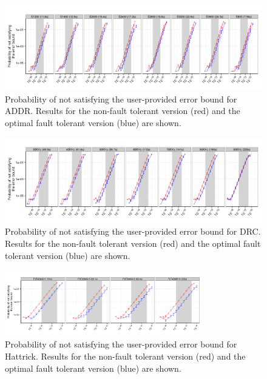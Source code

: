 \documentclass{sig-alternate}
\begin{document}
{\begin{figure}[ht!]
\centering
\includegraphics[width=7in]{figs/Lasso_Par_Seq_ImperfectRate_log.png}
\vspace{-10pt}
\caption{Probability of not satisfying the user-provided error bound for ADDR. Results for the non-fault tolerant version (red) and the optimal fault tolerant version (blue) are shown.}
\vspace{-10pt}
\label{fig:Lasso_ImperfectRate}
\end{figure}

\begin{figure}[ht!]
\centering
\includegraphics[width=7in]{figs/DRC_Par_Seq_ImperfectRate_log.png}
\vspace{-10pt}
\caption{Probability of not satisfying the user-provided error bound for DRC. Results for the non-fault tolerant version (red) and the optimal fault tolerant version (blue) are shown.}
\vspace{-10pt}
\label{fig:DRC_ImperfectRate}
\end{figure}

\begin{figure}[ht!]
\centering
\includegraphics[width=3.4in]{figs/Hattrick_Par_Seq_ImperfectRate_log.png}
\vspace{-10pt}
\caption{Probability of not satisfying the user-provided error bound for Hattrick. Results for the non-fault tolerant version (red) and the optimal fault tolerant version (blue) are shown.}
\vspace{-10pt}
\label{fig:Hattrick_ImperfectRate}
\end{figure}

}
\end{document}
